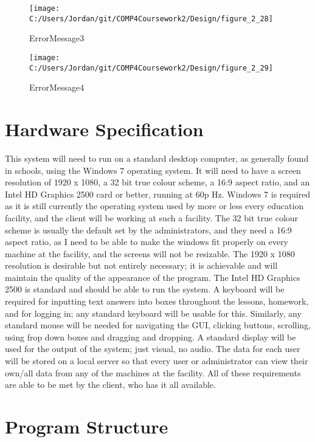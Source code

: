 \begin{figure}[H]
    \label{fig:print_function_result}\caption{ErrorMessage3}
    \texttt{[image: C:/Users/Jordan/git/COMP4Coursework2/Design/figure\_2\_28]}
\end{figure}

\begin{figure}[H]
    \label{fig:print_function_result}\caption{ErrorMessage4}
    \texttt{[image: C:/Users/Jordan/git/COMP4Coursework2/Design/figure\_2\_29]}
\end{figure}

\section{Hardware Specification}

This system will need to run on a standard desktop computer, as generally found in schools, using the Windows 7 operating system. It will need to have a screen resolution of 1920 x 1080, a 32 bit true colour scheme, a 16:9 aspect ratio, and an Intel HD Graphics 2500 card or better, running at 60p Hz. Windows 7 is required as it is still currently the operating system used by more or less every education facility, and the client will be working at such a facility. The 32 bit true colour scheme is usually the default set by the administrators, and they need a 16:9 aspect ratio, as I need to be able to make the windows fit properly on every machine at the facility, and the screens will not be resizable. The 1920 x 1080 resolution is desirable but not entirely necessary; it is achievable and will maintain the quality of the appearance of the program. The Intel HD Graphics 2500 is standard and should be able to run the system. A keyboard will be required for inputting text answers into boxes throughout the lessons, homework, and for logging in; any standard keyboard will be usable for this. Similarly, any standard mouse will be needed for navigating the GUI, clicking buttons, scrolling, using frop down boxes and dragging and dropping. A standard display will be used for the output of the system; just visual, no audio. The data for each user will be stored on a local server so that every user or administrator can view their own/all data from any of the machines at the facility. All of these requirements are able to be met by the client, who has it all available.

\section{Program Structure}


